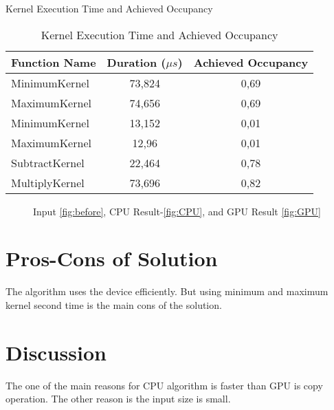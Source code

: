 \documentclass[11pt]{article} %
\begin{document}
	\begin{table}[htbp]
		\centering		
		\caption{Kernel Execution Time and Achieved Occupancy}
		\label{tab:table_3}%
		\begin{tabular}{lcc}
			Function Name & Duration ($\mu s$) & Achieved Occupancy \\ \hline \hline 
			MinimumKernel & 73,824 & 0,69 \\ \hline
			MaximumKernel & 74,656 & 0,69 \\ \hline
			MinimumKernel & 13,152 & 0,01 \\ \hline
			MaximumKernel & 12,96 & 0,01 \\ \hline
			SubtractKernel & 22,464 & 0,78 \\ \hline
			MultiplyKernel & 73,696 & 0,82 \\ \hline
		\end{tabular}%
		\caption{Kernel Execution Time and Achieved Occupancy}
		\label{tab:table_3}%
	\end{table}%
	\begin{figure}
		\centering
		\hfill
		\hfill
		\caption{Input \ref{fig:before}, CPU Result-\ref{fig:CPU}, and GPU Result \ref{fig:GPU} }
	\end{figure}
	
\section{Pros-Cons of Solution }
	\justifying The algorithm uses the device efficiently. But using minimum and maximum kernel second time is the main cons of the solution.
\section{Discussion}
	\justifying The one of the main reasons for CPU algorithm is faster than GPU is copy operation. The other reason is the input size is small.\\
\end{document}
